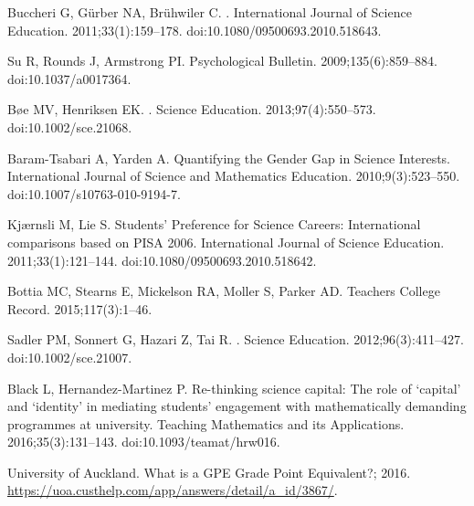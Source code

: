 \begin{thebibliography}{10}
Buccheri G, G{\"{u}}rber NA, Br{\"{u}}hwiler C.
.
\newblock International Journal of Science Education. 2011;33(1):159--178.
\newblock doi:{10.1080/09500693.2010.518643}.

Su R, Rounds J, Armstrong PI.
\newblock Psychological Bulletin. 2009;135(6):859--884.
\newblock doi:{10.1037/a0017364}.

B{\o}e MV, Henriksen EK.
.
\newblock Science Education. 2013;97(4):550--573.
\newblock doi:{10.1002/sce.21068}.

Baram-Tsabari A, Yarden A.
\newblock Quantifying the Gender Gap in Science Interests.
\newblock International Journal of Science and Mathematics Education.
  2010;9(3):523--550.
\newblock doi:{10.1007/s10763-010-9194-7}.

Kj{\ae}rnsli M, Lie S.
\newblock Students' Preference for Science Careers: International comparisons based on PISA 2006.
\newblock International Journal of Science Education. 2011;33(1):121--144.
\newblock doi:{10.1080/09500693.2010.518642}.

Bottia MC, Stearns E, Mickelson RA, Moller S, Parker AD.
\newblock Teachers College Record. 2015;117(3):1--46.

Sadler PM, Sonnert G, Hazari Z, Tai R.
.
\newblock Science Education. 2012;96(3):411--427.
\newblock doi:{10.1002/sce.21007}.

Black L, Hernandez-Martinez P.
\newblock Re-thinking science capital: The role of `capital' and `identity' in mediating students' engagement with mathematically demanding programmes at  university.
\newblock Teaching Mathematics and its Applications. 2016;35(3):131--143.
\newblock doi:{10.1093/teamat/hrw016}.

{University of Auckland}. What is a GPE Grade Point Equivalent?; 2016.
\newblock \url{https://uoa.custhelp.com/app/answers/detail/a_id/3867/}.


\end{thebibliography}

